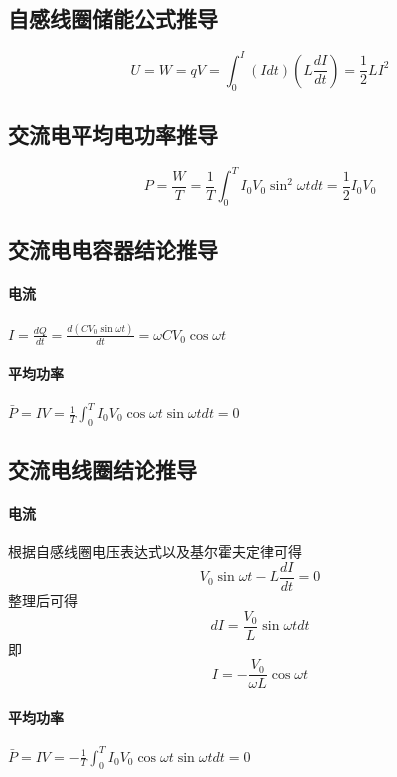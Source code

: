 \subsection{自感线圈储能公式推导}

\begin{equation*}
    U=W=qV
    =\int_0^I(Idt)\left(L\frac{dI}{dt}\right)
    =\frac12LI^2
\end{equation*}

\subsection{交流电平均电功率推导}

\begin{equation*}
    P=\frac{W}{T}
    =\frac1T\int_0^TI_0V_0\sin^2\omega tdt
    =\frac12I_0V_0
\end{equation*}

\subsection{交流电电容器结论推导}

\paragraph{电流} $I=\frac{dQ}{dt}=\frac{d(CV_0\sin\omega t)}{dt}=\omega CV_0\cos\omega t$

\paragraph{平均功率} $\bar{P}=IV=\frac1T\int_0^TI_0V_0\cos\omega t\sin\omega tdt=0$

\subsection{交流电线圈结论推导}

\paragraph{电流} 根据自感线圈电压表达式以及基尔霍夫定律可得
\begin{equation*}
    V_0\sin\omega t-L\frac{dI}{dt}=0
\end{equation*}
整理后可得
\begin{equation*}
    dI=\frac{V_0}{L}\sin\omega tdt
\end{equation*}
即
\begin{equation*}
    I=-\frac{V_0}{\omega L}\cos\omega t
\end{equation*}

\paragraph{平均功率} $\bar{P}=IV=-\frac1T\int_0^TI_0V_0\cos\omega t\sin\omega tdt=0$
